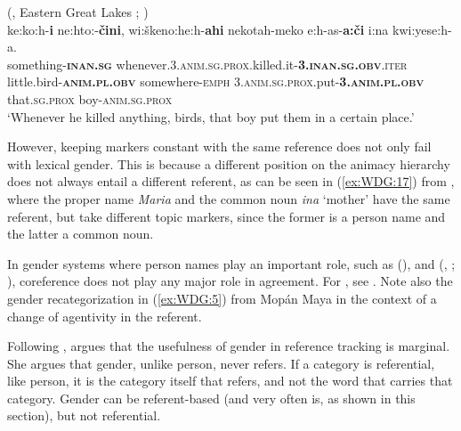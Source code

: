 \documentclass[output=collectionpaper]{langsci/langscibook}
\begin{document}
\ea\label{ex:WDG:16}
 (, Eastern Great Lakes ; \citealt[380]{Thomason2003})\\
\gll ke:ko:h-\textbf{i}	ne:hto:-\textbf{čini}, wi:škeno:he:h-\textbf{ahi} nekotah-meko e:h-as-\textbf{a:či}	i:na	kwi:yese:h-a.\\
something-\textbf{\textsc{inan.sg}}	whenever.3.\textsc{anim.sg.prox}.killed.it-\textbf{3.\textsc{inan.sg.obv}}.\textsc{iter} little.bird-\textbf{\textsc{anim.pl.obv}} 	somewhere-\textsc{emph} 3.\textsc{anim.sg.prox}.put-\textbf{3.\textsc{anim.pl.obv}}	that.\textsc{sg.prox}	boy-\textsc{anim.sg.prox}\\
\glt `Whenever he killed anything, birds, that boy put them in a certain place.'\\
\z

However, keeping markers constant with the same reference does not only fail with lexical gender. This is because a different position on the animacy hierarchy does not always entail a different referent, as can be seen in (\ref{ex:WDG:17}) from , where the proper name \textit{Maria} and the common noun \textit{ina} `mother' have the same referent, but take different topic markers, since the former is a person name and the latter a common noun.

%

In gender systems where person names play an important role, such as  (),  and  (, ; \citealt{Mellow2013}), coreference does not play any major role in agreement. For , see . Note also the gender recategorization in (\ref{ex:WDG:5}) from Mopán Maya in the context of a change of agentivity in the referent.

Following \cite[334--360]{Kibrik2011},  argues that the usefulness of gender in reference tracking is marginal. She argues that gender, unlike person, never refers. If a category is referential, like person, it is the category itself that refers, and not the word that carries that category. Gender can be referent-based (and very often is, as shown in this section), but not referential.
\end{document}
